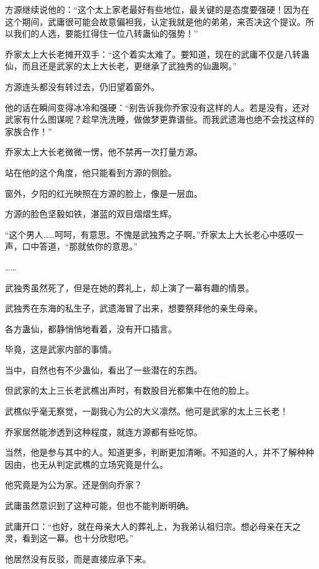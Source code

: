 
\begin{this_body}

方源继续说他的：“这个太上家老最好有些地位，最关键的是态度要强硬！因为在这个期间，武庸很可能会故意偏袒我，认定我就是他的弟弟，来否决这个提议。所以我们的人选，要能扛得住一位八转蛊仙的强势！”

乔家太上大长老摊开双手：“这个着实太难了。要知道，现在的武庸不仅是八转蛊仙，而且还是武家的太上大长老，更继承了武独秀的仙蛊啊。”

方源连头都没有转过去，仍旧望着窗外。

他的话在瞬间变得冰冷和强硬：“别告诉我你乔家没有这样的人。若是没有，还对武家有什么图谋呢？趁早洗洗睡，做做梦更靠谱些。而我武遗海也绝不会找这样的家族合作！”

乔家太上大长老微微一愣，他不禁再一次打量方源。

站在他的这个角度，他只能看到方源的侧脸。

窗外，夕阳的红光映照在方源的脸上，像是一层血。

方源的脸色坚毅如铁，湛蓝的双目熠熠生辉。

“这个男人……呵呵，有意思。不愧是武独秀之子啊。”乔家太上大长老心中感叹一声，口中答道，“那就依你的意思。”

……

武独秀虽然死了，但是在她的葬礼上，却上演了一幕有趣的情景。

武独秀在东海的私生子，武遗海冒了出来，想要祭拜他的亲生母亲。

各方蛊仙，都静悄悄地看着，没有开口插言。

毕竟，这是武家内部的事情。

当中，自然也有不少蛊仙，看出了一些潜在的东西。

但武家的太上三长老武樵出声时，有数股目光都集中在他的脸上。

武樵似乎毫无察觉，一副我心为公的大义凛然。他可是武家的太上三长老！

乔家居然能渗透到这种程度，就连方源都有些吃惊。

当然，他是参与其中的人。知道更多，判断更加清晰。不知道的人，并不了解种种因由，也无从判定武樵的立场究竟是什么。

他究竟是为公为家。还是倒向乔家？

武庸虽然意识到了这种可能，但也不能判断明确。

武庸开口：“也好，就在母亲大人的葬礼上，为我弟认祖归宗。想必母亲在天之灵，看到这一幕。也十分欣慰吧。”

他居然没有反驳，而是直接应承下来。


\end{this_body}
